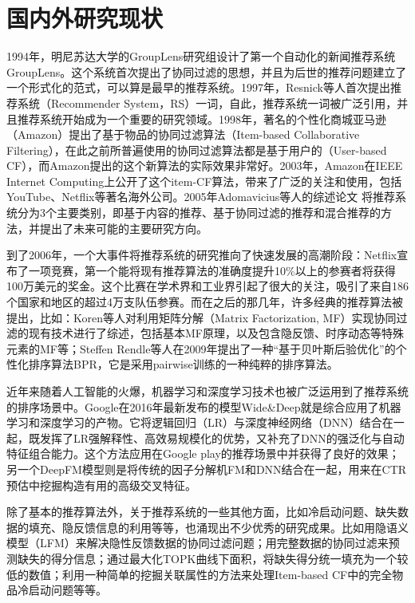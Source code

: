   \section{国内外研究现状}
  1994年，明尼苏达大学的GroupLens研究组设计了第一个自动化的新闻推荐系统GroupLens\cite{resnick1994grouplens}。这个系统首次提出了协同过滤的思想，并且为后世的推荐问题建立了一个形式化的范式，可以算是最早的推荐系统。1997年，Resnick等人\cite{resnick1997recommender}首次提出推荐系统（Recommender System，RS）一词，自此，推荐系统一词被广泛引用，并且推荐系统开始成为一个重要的研究领域。1998年，著名的个性化商城亚马逊（Amazon）提出了基于物品的协同过滤算法（Item-based Collaborative Filtering），在此之前所普遍使用的协同过滤算法都是基于用户的（User-based CF），而Amazon提出的这个新算法的实际效果非常好。2003年，Amazon在IEEE Internet Computing上公开了这个item-CF算法\cite{linden2003amazon}，带来了广泛的关注和使用，包括YouTube、Netflix等著名海外公司。2005年Adomavic{}ius等人的综述论文 将推荐系统分为3个主要类别，即基于内容的推荐、基于协同过滤的推荐和混合推荐的方法，并提出了未来可能的主要研究方向\cite{adomavicius2005toward}。

  到了2006年，一个大事件将推荐系统的研究推向了快速发展的高潮阶段：Netflix宣布了一项竞赛，第一个能将现有推荐算法的准确度提升10\%以上的参赛者将获得100万美元的奖金。这个比赛在学术界和工业界引起了很大的关注，吸引了来自186个国家和地区的超过4万支队伍参赛。而在之后的那几年，许多经典的推荐算法被提出，比如：Koren等人对利用矩阵分解（Matrix Factorization, MF）实现协同过滤的现有技术进行了综述\cite{koren2009matrix}，包括基本MF原理，以及包含隐反馈、时序动态等特殊元素的MF等；Steffen Rendle等人在2009年提出了一种“基于贝叶斯后验优化”的个性化排序算法BPR\cite{rendle2009bpr}，它是采用pairwise训练的一种纯粹的排序算法。

  近年来随着人工智能的火爆，机器学习和深度学习技术也被广泛运用到了推荐系统的排序场景中。Google在2016年最新发布的模型Wide\&Deep\cite{cheng2016wide}就是综合应用了机器学习和深度学习的产物。它将逻辑回归（LR）与深度神经网络（DNN）结合在一起，既发挥了LR强解释性、高效易规模化的优势，又补充了DNN的强泛化与自动特征组合能力。这个方法应用在Google play的推荐场景中并获得了良好的效果；另一个DeepFM模型\cite{guo2017deepfm}则是将传统的因子分解机FM和DNN结合在一起，用来在CTR预估中挖掘构造有用的高级交叉特征。

  除了基本的推荐算法外，关于推荐系统的一些其他方面，比如冷启动问题、缺失数据的填充、隐反馈信息的利用等等，也涌现出不少优秀的研究成果。比如用隐语义模型（LFM）来解决隐性反馈数据的协同过滤问题\cite{hu2008collaborative}；用完整数据的协同过滤来预测缺失的得分信息\cite{ren2012efficient}；通过最大化TOPK曲线下面积，将缺失得分统一填充为一个较低的数值\cite{steck2010training}；利用一种简单的挖掘关联属性的方法来处理Item-based CF中的完全物品冷启动问题\cite{zhang2019addressing}等等。


